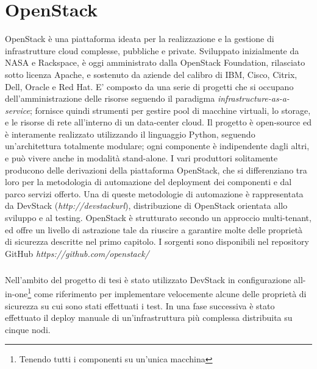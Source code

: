 \chapter{OpenStack}
OpenStack è una piattaforma ideata per la realizzazione e la gestione di infrastrutture cloud complesse, pubbliche e private.
Sviluppato inizialmente da NASA e Rackspace, è oggi amministrato dalla OpenStack Foundation, rilasciato sotto licenza Apache, e sostenuto da aziende del calibro di IBM, Cisco, Citrix, Dell, Oracle e Red Hat.
E' composto da una serie di progetti che si occupano dell'amministrazione delle risorse seguendo il paradigma \textit{infrastructure-as-a-service}; fornisce quindi strumenti per gestire pool di macchine virtuali, lo storage, e le risorse di rete all'interno di un data-center cloud.
Il progetto è open-source ed è interamente realizzato utilizzando il linguaggio Python, seguendo un'architettura totalmente modulare; ogni componente è indipendente dagli altri, e può vivere anche in modalità stand-alone.
I vari produttori solitamente producono delle derivazioni della piattaforma OpenStack, che si differenziano tra loro per la metodologia di automazione del deployment dei componenti e dal parco servizi offerto.
Una di queste metodologie di automazione è rappresentata da DevStack (\textit{http://devstackurl\cite{devstackurl}}), distribuzione di OpenStack orientata allo sviluppo e al testing.
OpenStack è strutturato secondo un approccio multi-tenant, ed offre un livello di astrazione tale da riuscire a garantire molte delle proprietà di sicurezza descritte nel primo capitolo.
I sorgenti sono disponibili nel repository GitHub \textit{https://github.com/openstack/}
\paragraph{}
Nell'ambito del progetto di tesi è stato utilizzato DevStack in configurazione all-in-one\footnote{Tenendo tutti i componenti su un'unica macchina} come riferimento per implementare velocemente alcune delle proprietà di sicurezza su cui sono stati effettuati i test.
In una fase successiva è stato effettuato il deploy manuale di un'infrastruttura più complessa distribuita su cinque nodi.

